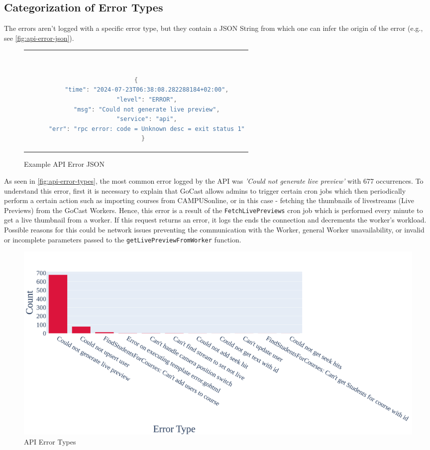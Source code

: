 \subsection{Categorization of Error Types}

The errors aren't logged with a specific error type, but they contain a JSON String from which one can infer the origin of the error (e.g., see \autoref{fig:api-error-json}).

\begin{figure}[htpb]
  \begin{tabular}{c}
  \ \small \begin{lstlisting}[language=Java]
    {
      "time": "2024-07-23T06:38:08.282288184+02:00",
      "level": "ERROR",
      "msg": "Could not generate live preview",
      "service": "api",
      "err": "rpc error: code = Unknown desc = exit status 1"
    }
    \end{lstlisting}
  \end{tabular}
  \caption[Example API Error JSON]{Example API Error JSON}\label{fig:api-error-json}
\end{figure}

As seen in \autoref{fig:api-error-types}, the most common error logged by the \ac{API} was \textit{'Could not generate live preview'} with 677 occurrences. To understand this error, first it is necessary to explain that GoCast allows admins to trigger certain cron jobs which then periodically perform a certain action such as importing courses from CAMPUSonline, or in this case - fetching the thumbnails of livestreams (Live Previews) from the GoCast Workers. Hence, this error is a result of the \texttt{FetchLivePreviews} cron job which is performed every minute to get a live thumbnail from a worker. If this request returns an error, it logs the  ends the connection and decrements the worker's workload. Possible reasons for this could be network issues preventing the communication with the Worker, general Worker unavailability, or invalid or incomplete parameters passed to the \texttt{getLivePreviewFromWorker} function.

\begin{figure}[htpb]
    \centering
    \includegraphics[width=\linewidth]{images/plots/api/error_types.png}
    \caption[\ac{API} Error Types]{\ac{API} Error Types}\label{fig:api-error-types}
\end{figure}

